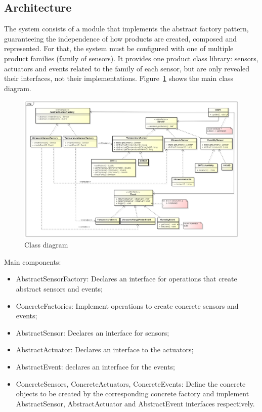 \documentclass{acm_proc_article-sp}
\begin{document}
\subsection{Architecture}
The system consists of a module that implements the abstract factory pattern, guaranteeing the independence of how products are created, composed and represented. For that, the system must be configured with one of multiple product families (family of sensors). It provides one product class library: sensors, actuators and events related to the family of each sensor, but are only revealed their interfaces, not their implementations. Figure~\ref{fig:classDiagram} shows the main class diagram.
\begin{figure}[ht]
\centering
    \includegraphics[resolution=300,width=1.0\textwidth,natwidth=610,natheight=642]{pictures/ClassDiagram2.png}
    \caption{Class diagram}
    \label{fig:classDiagram}
\end{figure}
\newline
\newline
Main components:
\begin{itemize}
\item AbstractSensorFactory: Declares an interface for operations that create abstract sensors and events;
\item ConcreteFactories: Implement operations to create concrete sensors and events;
\item AbstractSensor: Declares an interface for sensors;
\item AbstractActuator: Declares an interface to the actuators;
\item AbstractEvent: declares an interface for the events;
\item ConcreteSensors, ConcreteActuators, ConcreteEvents: Define the concrete objects to be created by the corresponding concrete factory and implement AbstractSensor, AbstractActuator and AbstractEvent interfaces respectively.

\end{itemize}
\end{document}
